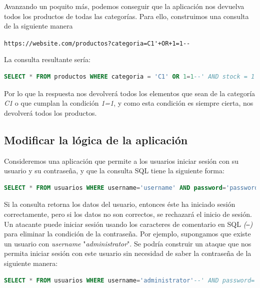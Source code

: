 \documentclass[bibliography=totocnumbered]{scrartcl}
\begin{document}
Avanzando un poquito más, podemos conseguir que la aplicación nos devuelva todos los productos de todas las categorías. Para ello, construimos una consulta de la siguiente manera
\begin{center}
\nolinkurl{https://website.com/productos?categoria=C1'+OR+1=1--}
\end{center}
La consulta resultante sería:
\begin{lstlisting}[language=SQL]
  SELECT * FROM productos WHERE categoria = 'C1' OR 1=1--' AND stock = 1
\end{lstlisting}
Por lo que la respuesta nos devolverá todos los elementos que sean de la categoría \textit{C1} o que cumplan la condición \textit{1=1}, y como esta condición es siempre cierta, nos devolverá todos los productos.

\subsection{Modificar la lógica de la aplicación}
Consideremos una aplicación que permite a los usuarios iniciar sesión con su usuario y su contraseña, y que la consulta SQL tiene la siguiente forma:
\begin{lstlisting}[language=SQL]
 SELECT * FROM usuarios WHERE username='username' AND password='password'
\end{lstlisting}
Si la consulta retorna los datos del usuario, entonces éste ha iniciado sesión correctamente, pero si los datos no son correctos, se rechazará el inicio de sesión.\\

Un atacante puede iniciar sesión usando los caracteres de comentario en SQL \textit{(\texttt{--})} para eliminar la condición de la contraseña. Por ejemplo, supongamos que existe un usuario con \textit{username} "\textit{administrator}". Se podría construir un ataque que nos permita iniciar sesión con este usuario sin necesidad de saber la contraseña de la siguiente manera:
\begin{lstlisting}[language=SQL]
 SELECT * FROM usuarios WHERE username='administrator'--' AND password=''
\end{lstlisting}
\end{document}
